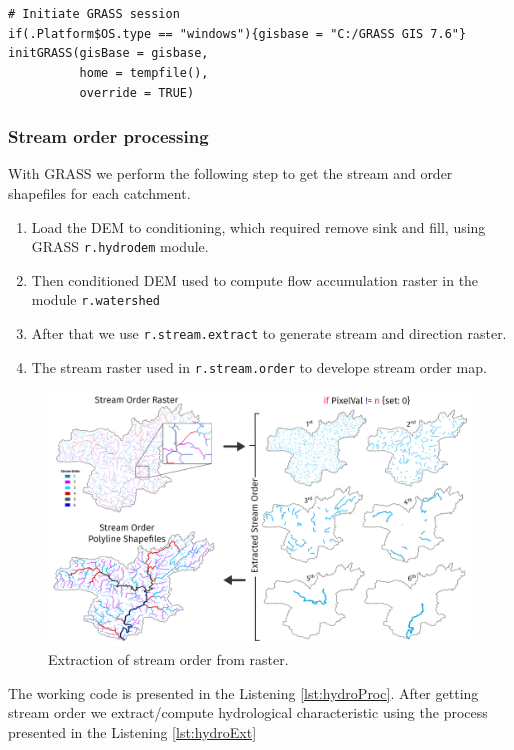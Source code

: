 \documentclass[a4paper, 12pt]{article}
\begin{document}
\begin{minipage}{1\linewidth}
\begin{verbatim}


# Initiate GRASS session 
if(.Platform$OS.type == "windows"){gisbase = "C:/GRASS GIS 7.6"}
initGRASS(gisBase = gisbase,
          home = tempfile(),
          override = TRUE)
\end{verbatim}
\end{minipage}

\subsubsection{Stream order processing}
With GRASS we perform the following step to get the stream and order shapefiles for each catchment.
\begin{enumerate}
\item Load the DEM to conditioning, which required remove sink and fill, using GRASS \texttt{r.hydrodem} module.
\item Then conditioned DEM used to compute flow accumulation raster in the module \texttt{r.watershed}
\item After that we use \texttt{r.stream.extract} to generate stream and direction raster.
\item The stream raster used in \texttt{r.stream.order} to develope stream order map.
\end{enumerate}

\begin{figure}
\includegraphics[width = 1\textwidth]{Figures/StreamOrderLength.pdf}
\caption{Extraction of stream order from raster.}
\label{fig:streamOrder}
\end{figure}

The working code is presented in the Listening \ref{lst:hydroProc}. After getting stream order we extract/compute hydrological characteristic using the process presented in the Listening \ref{lst:hydroExt}
\end{document}
